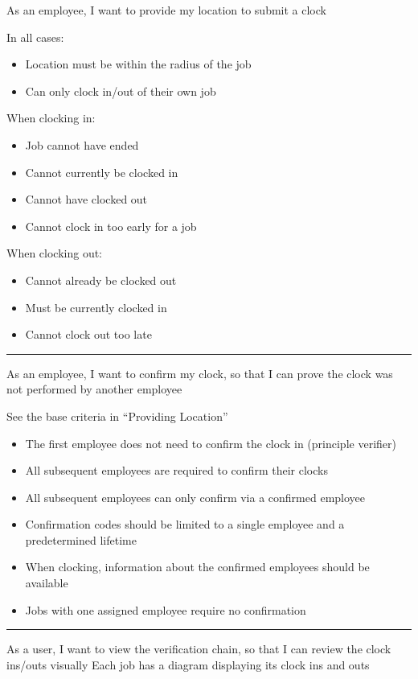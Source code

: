 {
  As an employee, I want to provide my location to submit
  a clock
}
{
  In all cases:
  \begin{itemize}
    \item Location must be within the radius of the job
    \item Can only clock in/out of their own job
  \end{itemize}

  When clocking in:
  \begin{itemize}
    \item Job cannot have ended
    \item Cannot currently be clocked in
    \item Cannot have clocked out
    \item Cannot clock in too early for a job
  \end{itemize}

  When clocking out:
  \begin{itemize}
    \item Cannot already be clocked out
    \item Must be currently clocked in
    \item Cannot clock out too late
  \end{itemize}
}
{
  \designs{\ref{fig:jobPage}, \ref{fig:clockPage}}
} \hrule

{
  As an employee, I want to confirm my clock, so that I can
  prove the clock was not performed by another employee
}
{
  See the base criteria in \enquote{Providing Location}

  \begin{itemize}
    \item The first employee does not need to confirm the
          clock in (principle verifier)
    \item All subsequent employees are required to confirm
          their clocks
    \item All subsequent employees can only confirm via a
          confirmed employee
    \item Confirmation codes should be limited to a single
          employee and a predetermined lifetime
    \item When clocking, information about the confirmed
          employees should be available
    \item Jobs with one assigned employee require no
          confirmation
  \end{itemize}
}
{
  \designs{\ref{fig:clockPage}, \ref{fig:confirmPage}}
} \hrule

{
  As a user, I want to view the verification chain, so that
  I can review the clock ins/outs visually
}
{
  Each job has a diagram displaying its clock ins and outs
}
{
  \designs{\ref{fig:confirmationsPage}}
}
